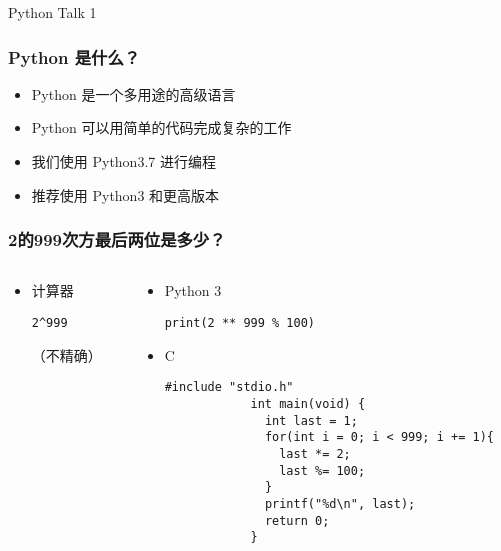 



\PreFirstFrame
\begin{frame} [fragile]
	\centerline{\fontsize{42}{42}\selectfont Python Talk 1}
\end{frame}
\PostFirstFrame

\begin{frame}
	\frametitle{Python 是什么？}
	\linespread{2}
	\begin{itemize}
	\item Python 是一个多用途的高级语言
	\item Python 可以用简单的代码完成复杂的工作
	\item 我们使用 Python3.7 进行编程
	\item 推荐使用 Python3 和更高版本
	\end{itemize}
\end{frame}

\begin{frame} [fragile]
	\frametitle{2的999次方最后两位是多少？}
	\begin{columns}[T]
		\begin{column}[T]{.2\textwidth}
			\begin{itemize}
			\item 计算器
			\begin{lstlisting}[style=pythonstyle, gobble=12]
			2^999
			\end{lstlisting}
			（不精确）
			\end{itemize}
		\end{column}
		\begin{column}[T]{.8\textwidth}
			\begin{itemize}
			\item Python 3
			\begin{lstlisting}[style=pythonstyle, gobble=12]
			print(2 ** 999 % 100)
			\end{lstlisting}
			\item C
			\begin{lstlisting}[style=cstyle, gobble=12]
			#include "stdio.h"
			int main(void) {
			  int last = 1;
			  for(int i = 0; i < 999; i += 1){
				last *= 2;
				last %= 100;
			  }
			  printf("%d\n", last);
			  return 0;
			}
			\end{lstlisting}
			\end{itemize}
		\end{column}
	\end{columns}
\end{frame}

